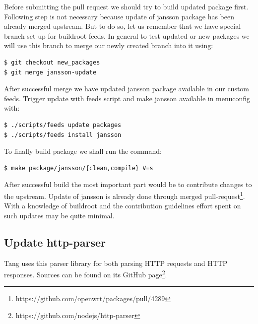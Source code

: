 Before submitting the pull request we should try to build updated package first.
Following step is not necessary because update of jansson package has been already merged upstream.
But to do so, let us remember that we have special branch set up for buildroot feeds.
In general to test updated or new packages we will use this branch to merge our newly created branch into it using:
\begin{lstlisting}[columns=fixed,basicstyle=\ttfamily\footnotesize,tabsize=4,backgroundcolor=\color{yellow!10}]
$ git checkout new_packages
$ git merge jansson-update
\end{lstlisting}
After successful merge we have updated jansson package available in our custom feeds.
Trigger update with feeds script and make jansson available in menuconfig with:
\begin{lstlisting}[columns=fixed,basicstyle=\ttfamily\footnotesize,tabsize=4,backgroundcolor=\color{yellow!10}]
$ ./scripts/feeds update packages
$ ./scripts/feeds install jansson
\end{lstlisting}
To finally build package we shall run the command:
\begin{lstlisting}[columns=fixed,basicstyle=\ttfamily\footnotesize,tabsize=4,backgroundcolor=\color{yellow!10}]
$ make package/jansson/{clean,compile} V=s
\end{lstlisting}

After successful build the most important part would be to contribute changes to the upstream.
Update of jansson is already done through merged pull-request\footnote{https://github.com/openwrt/packages/pull/4289}.
With a knowledge of buildroot and the contribution guidelines effort spent on such updates may be quite minimal.



\subsection{Update http-parser}\label{http-parser}
Tang uses this parser library for both parsing HTTP requests and HTTP responses.
Sources can be found on its GitHub page\footnote{https://github.com/nodejs/http-parser}.

